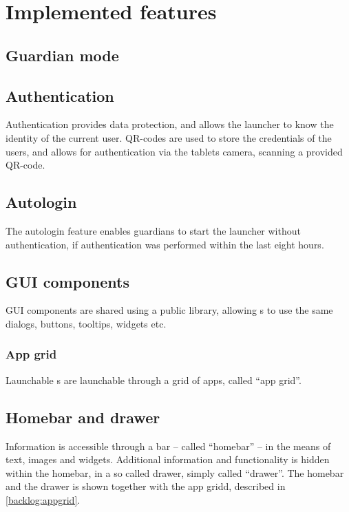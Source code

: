 \section{Implemented features}
\label{backlog_implemented}

\subsection{Guardian mode}
\label{backlog:guardian_mode}


%
\subsection{Authentication}
\label{backlog:authentication}
Authentication provides data protection, and allows the launcher to know the identity of the current user.
QR-codes are used to store the credentials of the users, and allows for authentication via the tablets camera, scanning a provided QR-code.

\subsection{Autologin}
\label{backlog:autologin}
The autologin feature enables guardians to start the launcher without authentication, if authentication was performed within the last eight hours.

%
\subsection{GUI components}
\label{backlog:GUI_components}
GUI components are shared using a public library, allowing \girafapp[]s to use the same dialogs, buttons, tooltips, widgets etc.

\subsubsection{App grid}
\label{backlog:appgrid}
Launchable \girafapp[]s are launchable through a grid of apps, called ``app grid''.

%
\subsection{Homebar and drawer}
\label{backlog:homebar_drawer}
Information is accessible through a bar -- called ``homebar'' -- in the means of text, images and widgets.
Additional information and functionality is hidden within the homebar, in a so called drawer, simply called ``drawer''. The homebar and the drawer is shown together with the app gridd, described in \autoref{backlog:appgrid}.


